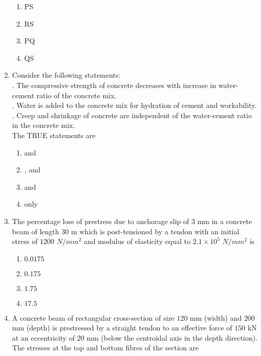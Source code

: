 \documentclass[journal,12pt,onecolumn]{IEEEtran}
\theoremstyle{remark}
\begin{document}
\begin{enumerate}[start=35]
\begin{enumerate}
	\item PS
	\item RS
	\item PQ
	\item QS\\
\end{enumerate}
        \item Consider the following statements:\\
	\uppercase\expandafter{}. The compressive strength of concrete decreases with increase in water-cement ratio of the concrete mix.\\
	\uppercase\expandafter{}. Water is added to the concrete mix for hydration of cement and workability.\\
	\uppercase\expandafter{}. Creep and shrinkage of concrete are independent of the water-cement ratio in the concrete mix.\\
	The TRUE statements are
	\begin{enumerate}
		\item \uppercase\expandafter{} and \uppercase\expandafter{}
		\item \uppercase\expandafter{},\uppercase\expandafter{} and \uppercase\expandafter{}
		\item \uppercase\expandafter{} and \uppercase\expandafter{}
		\item only \uppercase\expandafter{}\\
	\end{enumerate}
            \item The percentage loss of prestress due to anchorage slip of $3$ mm in a concrete beam of length $30$ m which is post-tensioned by a tendon with an initial stress of $1200$ $N/mm^2$ and modulus of elasticity equal to $2.1\times{10}^{5}$ $N/mm^2$ is 
		    \begin{enumerate}
			    \item $0.0175$
			    \item $0.175$
			    \item $1.75$
			    \item $17.5$\\
		    \end{enumerate}
	    \item A concrete beam of rectangular cross-section of size $120$ mm (width) and $200$ mm (depth) is prestressed by a straight tendon to an effective force of $150$ kN at an eccentricity of $20$ mm (below the centroidal axis in the depth direction). The stresses at the top and bottom fibres of the section are

\end{enumerate}
\end{document}
